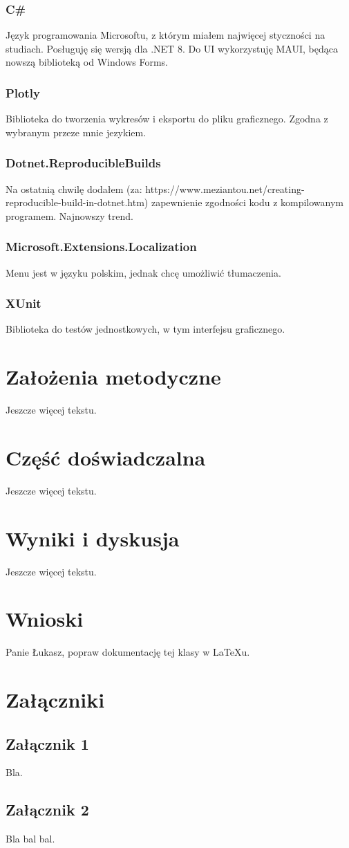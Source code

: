 \documentclass{SGGW-thesis}
\begin{document}
\subsection{C\#}
Język programowania Microsoftu, z którym miałem najwięcej styczności na studiach. Posługuję się wersją dla .NET 8. Do UI wykorzystuję MAUI, będąca nowszą biblioteką od Windows Forms.
\subsection{Plotly}
Biblioteka do tworzenia wykresów i eksportu do pliku graficznego. Zgodna z wybranym przeze mnie jezykiem.
\subsection{Dotnet.ReproducibleBuilds}
Na ostatnią chwilę dodałem  (za: https://www.meziantou.net/creating-reproducible-build-in-dotnet.htm) zapewnienie zgodności kodu z kompilowanym programem. Najnowszy trend.
\subsection{Microsoft.Extensions.Localization}
Menu jest w języku polskim, jednak chcę umożliwić tłumaczenia.
\subsection{XUnit}
Biblioteka do testów jednostkowych, w tym interfejsu graficznego.

\chapter{Założenia metodyczne}
Jeszcze więcej tekstu.

\chapter{Część doświadczalna}
Jeszcze więcej tekstu.

\chapter{Wyniki i dyskusja}
Jeszcze więcej tekstu.

\chapter{Wnioski}
Panie Łukasz, popraw dokumentację tej klasy w LaTeXu.

\chapter{Załączniki}
\section{Załącznik 1}
Bla.

\section{Załącznik 2}
Bla bal bal.



\beforelastpage[2023]
\end{document}
